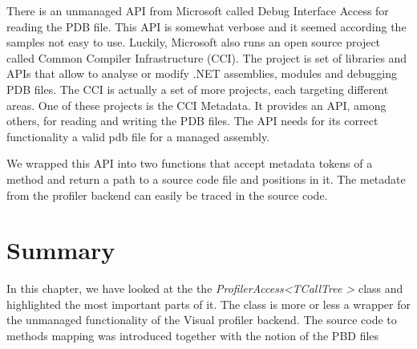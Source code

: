 There is an unmanaged API from Microsoft called Debug Interface Access for reading the PDB file. This API is somewhat verbose and it seemed according the samples not easy to use. Luckily, Microsoft also runs an open source project called Common Compiler Infrastructure (CCI). The project is set of libraries and APIs that allow to analyse or modify .NET assemblies, modules and debugging PDB files. The CCI is actually a set of more projects, each targeting different areas. One of these projects is the CCI Metadata. It provides an API, among others, for reading and writing the PDB files. The API needs for its correct functionality a valid pdb file for a managed assembly.

We wrapped this API into two functions that accept metadata tokens of a method and return a path to a source code file and positions in it. The metadate from the profiler backend can easily be traced in the source code. 


\section{Summary}
In this chapter, we have looked at the the \textit{ProfilerAccess\textless TCallTree \textgreater} class and highlighted the most important parts of it. The class is more or less a wrapper for the unmanaged functionality of the Visual profiler backend. The source code to methods mapping was introduced together with the notion of the PBD files